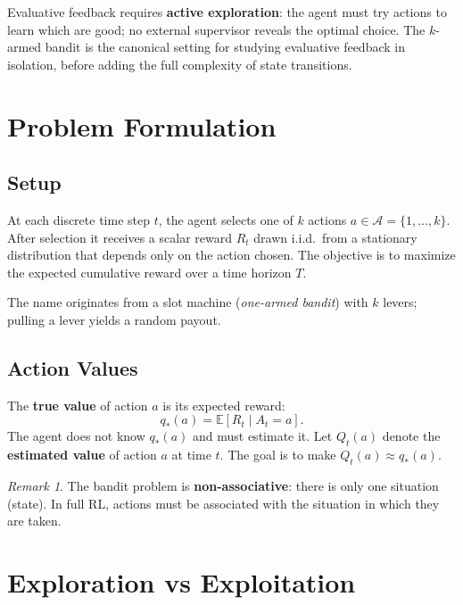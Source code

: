 \documentclass[11pt,a4paper]{article}
\theoremstyle{definition}
\theoremstyle{plain}
\theoremstyle{remark}
\newtheorem*{remark}{Remark}
\begin{document}
Evaluative feedback requires \textbf{active exploration}: the agent must try actions to learn which are good; no external supervisor reveals the optimal choice. The $k$-armed bandit is the canonical setting for studying evaluative feedback in isolation, before adding the full complexity of state transitions.

\section{Problem Formulation}

\subsection{Setup}

\begin{tcolorbox}[colback=blue!5!white,colframe=blue!75!black,title=\textbf{$k$-Armed Bandit}]
At each discrete time step $t$, the agent selects one of $k$ actions $a \in \mathcal{A} = \{1, \ldots, k\}$. After selection it receives a scalar reward $R_t$ drawn i.i.d.\ from a stationary distribution that depends only on the action chosen. The objective is to maximize the expected cumulative reward over a time horizon $T$.
\end{tcolorbox}

The name originates from a slot machine (\emph{one-armed bandit}) with $k$ levers; pulling a lever yields a random payout.

\subsection{Action Values}

The \textbf{true value} of action $a$ is its expected reward:
\[
    q_*(a) = \mathbb{E}[R_t \mid A_t = a].
\]
The agent does not know $q_*(a)$ and must estimate it. Let $Q_t(a)$ denote the \textbf{estimated value} of action $a$ at time $t$. The goal is to make $Q_t(a) \approx q_*(a)$.

\begin{remark}
The bandit problem is \textbf{non-associative}: there is only one situation (state). In full RL, actions must be associated with the situation in which they are taken.
\end{remark}

\section{Exploration vs Exploitation}
\end{document}

